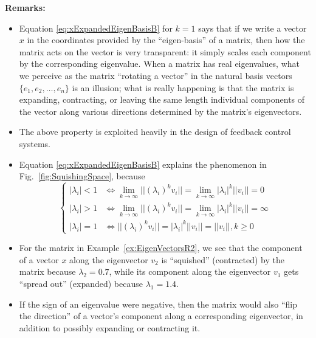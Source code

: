 \textbf{Remarks:} 
\begin{itemize}
    \item Equation \eqref{eq:xExpandedEigenBasisB} for $k=1$ says that if we write a vector $x$ in the coordinates provided by the ``eigen-basis'' of a matrix, then how the matrix acts on the vector is very transparent: it simply scales each component by the corresponding eigenvalue. When a matrix has real eigenvalues, what we perceive as the matrix ``rotating a vector'' in the natural basis vectors $\{e_1, e_2, \ldots, e_n \}$ is an illusion; what is really happening is that the matrix is expanding, contracting, or leaving the same length individual components of the vector along various directions determined by the matrix's eigenvectors. 
    \item The above property is exploited heavily in the design of feedback control systems. 
    \item Equation \eqref{eq:xExpandedEigenBasisB} explains the phenomenon in Fig.~\ref{fig:SquishingSpace}, because 
    $$ \begin{cases} 
    |\lambda_i| < 1 & \iff  \lim_{k \to \infty}  ||(\lambda_i)^k v_i||= \lim_{k \to \infty}  |\lambda_i|^k  ||v_i||=0\\  
    |\lambda_i| >1 & \iff  \lim_{k \to \infty}  ||(\lambda_i)^k v_i||= \lim_{k \to \infty}  |\lambda_i|^k  ||v_i||= \infty \\
    |\lambda_i|= 1 & \iff || (\lambda_i)^k v_i|| = |\lambda_i|^k  || v_i||= ||v_i||, k\ge 0 
    \end{cases} 
    $$
    \item For the matrix in Example~\ref{ex:EigenVectorsR2}, we see that the component of a vector $x$ along the eigenvector $v_2$ is ``squished'' (contracted) by the matrix because $\lambda_2=0.7$, while its component along the eigenvector $v_1$ gets ``spread out'' (expanded) because $\lambda_1=1.4$. 
    \item If the sign of an eigenvalue were negative, then the matrix would also ``flip the direction'' of a vector's component along a corresponding eigenvector, in addition to possibly expanding or contracting it. 
\end{itemize}

\vspace*{.2cm}

